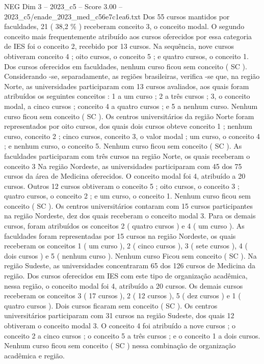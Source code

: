 \begin{textsample}{NEG Dim 3 – 2023\_c5 – Score 3.00 – 2023\_c5/enade\_2023\_med\_c56e7c1ea6.txt}
Dos 55 cursos mantidos por faculdades, 21 ( 38,2 \% ) receberam conceito 3, o conceito modal.
O segundo conceito mais frequentemente atribuído aos cursos oferecidos por essa categoria de IES foi o conceito 2, recebido por 13 cursos.
Na sequência, nove cursos obtiveram conceito 4 ; oito cursos, o conceito 5 ; e quatro cursos, o conceito 1.
Dos cursos oferecidos em faculdades, nenhum curso ficou sem conceito ( SC ).
Considerando -se, separadamente, as regiões brasileiras, verifica -se que, na região Norte, as universidades participaram com 13 cursos avaliados, aos quais foram atribuídos os seguintes conceitos : 1 a um curso ; 2 a três cursos ; 3, o conceito modal, a cinco cursos ; conceito 4 a quatro cursos ; e 5 a nenhum curso.
Nenhum curso ficou sem conceito ( SC ).
Os centros universitários da região Norte foram representados por oito cursos, dos quais dois cursos obteve conceito 1 ; nenhum curso, conceito 2 ; cinco cursos, conceito 3, o valor modal ; um curso, o conceito 4 ; e nenhum curso, o conceito 5.
Nenhum curso ficou sem conceito ( SC ).
As faculdades participaram com três cursos na região Norte, os quais receberam o conceito 3 Na região Nordeste, as universidades participaram com 45 dos 75 cursos da área de Medicina oferecidos.
O conceito modal foi 4, atribuído a 20 cursos.
Outros 12 cursos obtiveram o conceito 5 ; oito cursos, o conceito 3 ; quatro cursos, o conceito 2 ; e um curso, o conceito 1.
Nenhum curso ficou sem conceito ( SC ).
Os centros universitários contaram com 15 cursos participantes na região Nordeste, dez dos quais receberam o conceito modal 3.
Para os demais cursos, foram atribuídos os conceitos 2 ( quatro cursos ) e 4 ( um curso ).
As faculdades foram representadas por 15 cursos na região Nordeste, os quais receberam os conceitos 1 ( um curso ), 2 ( cinco cursos ), 3 ( sete cursos ), 4 ( dois cursos ) e 5 ( nenhum curso ).
Nenhum curso Ficou sem conceito ( SC ).
Na região Sudeste, as universidades concentraram 65 dos 126 cursos de Medicina da região.
Dos cursos oferecidos em IES com este tipo de organização acadêmica, nessa região, o conceito modal foi 4, atribuído a 20 cursos.
Os demais cursos receberam os conceitos 3 ( 17 cursos ), 2 ( 12 cursos ), 5 ( dez cursos ) e 1 ( quatro cursos ).
Dois cursos ficaram sem conceito ( SC ).
Os centros universitários participaram com 31 cursos na região Sudeste, dos quais 12 obtiveram o conceito modal 3.
O conceito 4 foi atribuído a nove cursos ; o conceito 2 a cinco cursos ; o conceito 5 a três cursos ; e o conceito 1 a dois cursos.
Nenhum curso ficou sem conceito ( SC ) nessa combinação de organização acadêmica e região.

\end{textsample}

